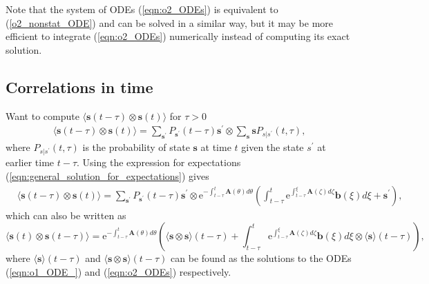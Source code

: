 \documentclass[a4paper, 11pt]{article}
\begin{document}
Note that the system of ODEs (\ref{eqn:o2_ODEs}) is equivalent to (\ref{o2_nonstat_ODE}) and can be solved in a similar way, but it may be more efficient to integrate (\ref{eqn:o2_ODEs}) numerically instead of computing its exact solution.

\subsection{Correlations in time}
Want to compute $\langle\mathbf s(t-\tau)\otimes\mathbf s(t)\rangle$ for $\tau>0$
\begin{align*}
  \langle\mathbf s(t-\tau)\otimes\mathbf s(t)\rangle = \sum_\mathbf {s^\prime} P_{\mathbf s^\prime}(t-\tau)\mathbf s^\prime\otimes\sum_{\mathbf s}\mathbf sP_{s|s^\prime}(t, \tau),
\end{align*}
where $P_{s|s^\prime}(t, \tau)$ is the probability of state $\mathbf s$ at time $t$ given the state $s^\prime$ at earlier time $t-\tau$. Using the expression for expectations (\ref{eqn:general_solution_for_expectations}) gives
\begin{align*}
  &\langle\mathbf s(t-\tau)\otimes\mathbf s(t)\rangle = \sum_\mathbf {s^\prime} P_{\mathbf s^\prime}(t-\tau)\mathbf s^\prime\otimes\mathrm e^{-\int_{t-\tau}^t\mathbf A(\theta)d\theta}\left(\int_{t-\tau}^t\mathrm e^{\int_{t-\tau}^\xi\mathbf A(\zeta)d\zeta}\mathbf b(\xi)d\xi + \mathbf s^\prime\right),
\end{align*}
which can also be written as
\begin{equation*}
  \langle\mathbf s(t)\otimes\mathbf s(t-\tau)\rangle = \mathrm e^{-\int_{t-\tau}^t\mathbf A(\theta)d\theta}\left(\langle\mathbf s\otimes\mathbf s\rangle(t-\tau) + \int_{t-\tau}^t\mathrm e^{\int_{t-\tau}^\xi\mathbf A(\zeta)d\zeta}\mathbf b(\xi)d\xi\otimes \langle \mathbf s\rangle(t-\tau)\right),
\end{equation*}
where $\langle\mathbf s\rangle(t-\tau)$ and $\langle\mathbf s\otimes\mathbf s\rangle(t-\tau)$ can be found as the solutions to the ODEs (\ref{eqn:o1_ODE_}) and (\ref{eqn:o2_ODEs}) respectively.


\end{document}
